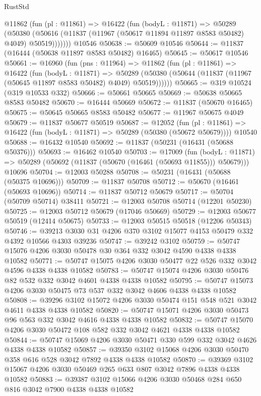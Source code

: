 \begin{lexlean}{RustStd}
\begin{coremodule}
{\begin{coremodule}
{{{{{{{{{{{{{{{{{{{{{{{{{{{{{{{{{{{{{{{{{{{{{{{{{{      @11862
        (fun (pl : @11861) =>
        @16422
          (fun (bodyL : @11871) =>
          @50289
            (@50380 (@50616 (@11837 (@11967 (@50617 @11894 @11897 @8583 @50482) @4049) @50519)))))))
    @10546
@50638 := @50609 @10546
@50644 := @11837 (@16444 (@50638 @11897 @8583 @50482) @16465)
@50645 := @50617 @10546
@50661 := @16960
    (fun (pns : @11964) =>
    @11862
      (fun (pl : @11861) =>
      @16422
        (fun (bodyL : @11871) =>
        @50289 (@50380 (@50644 (@11837 (@11967 (@50645 @11897 @8583 @50482) @4049) @50519))))))
@50665 := @319 @10524 (@319 @10533 @332)
@50666 := @50661 @50665
@50669 := @50638 @50665 @8583 @50482
@50670 := @16444 @50669
@50672 := @11837 (@50670 @16465)
@50675 := @50645 @50665 @8583 @50482
@50677 := @11967 @50675 @4049
@50679 := @11837 @50677 @50519
@50687 := @12052
    (fun (pl : @11861) => @16422 (fun (bodyL : @11871) => @50289 (@50380 (@50672 @50679))))
    @10540
@50688 := @16432 @10540
@50692 := @11837 (@50231 (@16431 (@50688 @50376)))
@50693 := @16462 @10540
@50703 := @17009
    (fun (bodyL : @11871) => @50289 (@50692 (@11837 (@50670 (@16461 (@50693 @11855))) @50679)))
    @10696
@50704 := @12003 @50288
@50708 := @50231 (@16431 (@50688 (@50375 @10696)))
@50709 := @11837 @50708
@50712 := @50670 (@16461 (@50693 @10696))
@50714 := @11837 @50712 @50679
@50717 := @50704 (@50709 @50714) @38411
@50721 := @12003 @50708 @50714 (@12201 @50230)
@50725 := @12003 @50712 @50679 (@17046 @50669)
@50729 := @12003 @50677 @50519 (@12414 @50675)
@50733 := @12003 @50515 @50518 (@12206 @50343)
@50746 := @39213 @3030 @31 @4206 @370 @3102 @15077 @4153 @50479 @332 @4392 @10566 @4303 @39236
@50747 := @39242 @3102
@50759 := @50747 @15076 @4206 @3030 @50478 @30 @364 @332 @3042 @4590 @4338 @4338 @10582
@50771 := @50747 @15075 @4206 @3030 @50477 @22 @526 @332 @3042 @4596 @4338 @4338 @10582
@50783 := @50747 @15074 @4206 @3030 @50476 @82 @532 @332 @3042 @4601 @4338 @4338 @10582
@50795 := @50747 @15073 @4206 @3030 @50475 @73 @537 @332 @3042 @4606 @4338 @4338 @10582
@50808 := @39296 @3102 @15072 @4206 @3030 @50474 @151 @548 @521 @3042 @4611 @4338 @4338 @10582
@50820 := @50747 @15071 @4206 @3030 @50473 @96 @563 @332 @3042 @4616 @4338 @4338 @10582
@50832 := @50747 @15070 @4206 @3030 @50472 @108 @582 @332 @3042 @4621 @4338 @4338 @10582
@50844 := @50747 @15069 @4206 @3030 @50471 @330 @599 @332 @3042 @4626 @4338 @4338 @10582
@50857 := @39350 @3102 @15068 @4206 @3030 @50470 @358 @616 @528 @3042 @7892 @4338 @4338 @10582
@50870 := @39369 @3102 @15067 @4206 @3030 @50469 @265 @633 @807 @3042 @7896 @4338 @4338 @10582
@50883 := @39387 @3102 @15066 @4206 @3030 @50468 @284 @650 @816 @3042 @7900 @4338 @4338 @10582
}}}}}}}}}}}}}}}}}}}}}}}}}}}}}}}}}}}}}}}}}}}}}}}}}}
\end{coremodule}}
\end{coremodule}
\end{lexlean}
